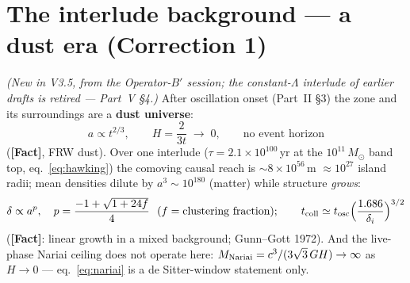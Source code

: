 \documentclass[11pt]{article}
\newcommand{\Fact}{\textbf{\textcolor{green!45!black}{[Fact]}}}
\newcommand{\msun}{M_\odot}
\begin{document}
\section{The interlude background --- a dust era (Correction 1)}
\emph{(New in V3.5, from the Operator-$B'$ session; the constant-$\Lambda$ interlude of earlier drafts is retired --- Part~V \S4.)} After oscillation onset (Part~II \S3) the zone and its surroundings are a \textbf{dust universe}:
\begin{equation}
a\propto t^{2/3},\qquad H=\frac{2}{3t}\;\to\;0,\qquad\text{no event horizon}
\label{eq:dustera}
\end{equation}
(\Fact, FRW dust). Over one interlude ($\tau=2.1\times10^{100}$\,yr at the $10^{11}\,\msun$ band top, eq.~\eqref{eq:hawking}) the comoving causal reach is $\sim8\times10^{56}$\,m $\approx10^{27}$ island radii; mean densities dilute by $a^3\sim10^{180}$ (matter) while structure \emph{grows}:
\begin{equation}
\delta\propto a^{p},\quad p=\frac{-1+\sqrt{1+24f}}{4}\ \ (f=\text{clustering fraction});\qquad
t_{\rm coll}\simeq t_{\rm osc}\Bigl(\frac{1.686}{\delta_i}\Bigr)^{3/2}
\label{eq:gunngott}
\end{equation}
(\Fact: linear growth in a mixed background; Gunn--Gott 1972). And the live-phase Nariai ceiling does not operate here: $M_{\rm Nariai}=c^3/(3\sqrt3\,GH)\to\infty$ as $H\to0$ --- eq.~\eqref{eq:nariai} is a de Sitter-window statement only.
\end{document}
